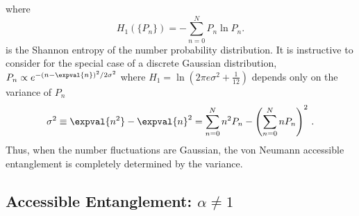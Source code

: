 %
where
%
\begin{equation}
    H_1(\{P_n\}) = -\sum_{n=0}^N P_n \ln P_n.
\label{eq:H1}
\end{equation}
%
is the Shannon entropy of the number probability distribution.  It is instructive to consider  for the special case of a discrete Gaussian distribution, $P_n \propto e^{-(n-\expval{n})^2/2\sigma^2}$ where $H_1 = \ln\left(2\pi e \sigma^2 + \tfrac{1}{12}\right)$ depends only on the variance of $P_n$
%
\begin{equation}
    \sigma^2 \equiv \expval{n^2}-\expval{n}^2 = \sum_{n=0}^N n^2 P_n  - \left(\sum_{n=0}^N n P_n\right)^2\,.
\label{eq:sigma2}
\end{equation}
%
Thus, when the number fluctuations are Gaussian, the von Neumann accessible entanglement is completely determined by the variance.

\subsection{\ren Accessible Entanglement: $\alpha \ne 1$}

